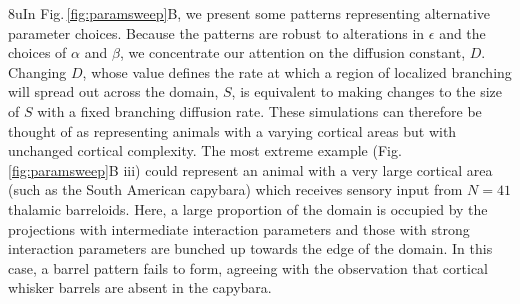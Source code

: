 \documentclass[9pt,lineno]{elife}
\newcommand{\MPthreePar}[1]{\textcolor{revbblack}{#1}}
\begin{document}
\MPthreePar8u{In Fig.\,\ref{fig:paramsweep}B, we present some patterns
  representing alternative parameter choices. Because the patterns are robust
  to alterations in $\epsilon$ and the choices of $\alpha$ and $\beta$, we
  concentrate our attention on the diffusion constant, $D$. Changing $D$,
  whose value defines the rate at which a region of localized branching will
  spread out across the domain, $S$, is equivalent to making changes to the
  size of $S$ with a fixed branching diffusion rate. These simulations can
  therefore be thought of as representing animals with a varying cortical
  areas but with unchanged cortical complexity. The most extreme example
  (Fig.\,\ref{fig:paramsweep}B iii) could represent an animal with a very
  large cortical area (such as the South American capybara) which receives
  sensory input from $N=41$ thalamic barreloids. Here, a large proportion of
  the domain is occupied by the projections with intermediate interaction
  parameters and those with strong interaction parameters are bunched up
  towards the edge of the domain. In this case, a barrel pattern fails to
  form, agreeing with the observation that cortical whisker barrels are absent
  in the capybara.}
\end{document}
